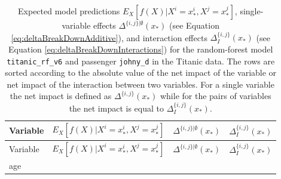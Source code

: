 \documentclass[12pt,]{krantz}
\begin{document}
\begin{longtable}[]{@{}lrrr@{}}
\caption{\label{tab:titanicIBreakDownList} Expected model predictions \(E_X[f(X)|X^i = x_*^i, X^j = x_*^j]\), single-variable effects \(\Delta^{\{i,j\}|\emptyset}(x_*)\) (see Equation \eqref{eq:deltaBreakDownAdditive}), and interaction effects \(\Delta_{I}^{\{i,j\}}(x_*)\) (see Equation \eqref{eq:deltaBreakDownInteractions}) for the random-forest model \texttt{titanic\_rf\_v6} and passenger \texttt{johny\_d} in the Titanic data. The rows are sorted according to the absolute value of the net impact of the variable or net impact of the interaction between two variables. For a single variable the net impact is defined as \(\Delta^{\{i,j\}}(x_*)\) while for the pairs of variables the net impact is equal to \(\Delta_{I}^{\{i,j\}}(x_*)\).}\tabularnewline
\toprule
\begin{minipage}[b]{0.36\columnwidth}\raggedright
Variable\strut
\end{minipage} & \begin{minipage}[b]{0.14\columnwidth}\raggedleft
\(E_X[f(X)|X^{i}= x_*^{i},X^{j}= x_*^{j}]\)\strut
\end{minipage} & \begin{minipage}[b]{0.16\columnwidth}\raggedleft
\(\Delta^{\{i,j\}|\emptyset}(x_*)\)\strut
\end{minipage} & \begin{minipage}[b]{0.23\columnwidth}\raggedleft
\(\Delta_{I}^{\{i,j\}}(x_*)\)\strut
\end{minipage}\tabularnewline
\midrule
\endfirsthead
\toprule
\begin{minipage}[b]{0.36\columnwidth}\raggedright
Variable\strut
\end{minipage} & \begin{minipage}[b]{0.14\columnwidth}\raggedleft
\(E_X[f(X)|X^{i}= x_*^{i},X^{j}= x_*^{j}]\)\strut
\end{minipage} & \begin{minipage}[b]{0.16\columnwidth}\raggedleft
\(\Delta^{\{i,j\}|\emptyset}(x_*)\)\strut
\end{minipage} & \begin{minipage}[b]{0.23\columnwidth}\raggedleft
\(\Delta_{I}^{\{i,j\}}(x_*)\)\strut
\end{minipage}\tabularnewline
\midrule
\endhead
\begin{minipage}[t]{0.36\columnwidth}\raggedright
age\strut
\end{minipage} & \begin{minipage}[t]{0.14\columnwidth}\raggedleft

\end{minipage}
\end{longtable}
\end{document}
